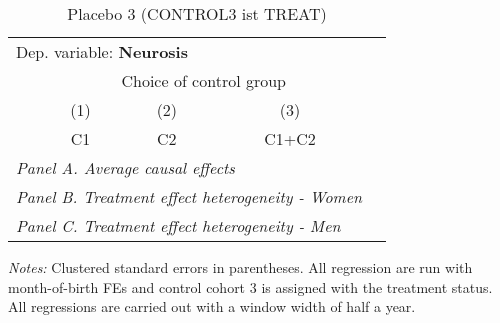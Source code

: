  \begin{table}[H] \centering \begin{threeparttable} \caption{Placebo 3 (CONTROL3 ist TREAT) } {\def\sym#1{\ifmmode^{#1}\else\(^{#1}\)\fi} \begin{tabular}{l*{4}{c}} \toprule \multicolumn{4}{l}{Dep. variable: \textbf{Neurosis}} \\ & \multicolumn{3}{c}{Choice of control group} \\ \cmidrule(lr){2-4}
            &\multicolumn{1}{c}{(1)}&\multicolumn{1}{c}{(2)}&\multicolumn{1}{c}{(3)}\\
            &\multicolumn{1}{c}{C1}&\multicolumn{1}{c}{C2}&\multicolumn{1}{c}{C1+C2}\\
\midrule
 \multicolumn{4}{l}{\emph{Panel A. Average causal effects}} \\      \midrule\multicolumn{4}{l}{\emph{Panel B. Treatment effect heterogeneity - Women}} \\      \midrule\multicolumn{4}{l}{\emph{Panel C. Treatment effect heterogeneity - Men}} \\      
\bottomrule \end{tabular} } \begin{tablenotes} \item \scriptsize \emph{Notes:} Clustered standard errors in parentheses. All regression are run with month-of-birth FEs and control cohort 3 is assigned with the treatment status. All regressions are carried out with a window width of half a year. \end{tablenotes} \end{threeparttable} \end{table} 
